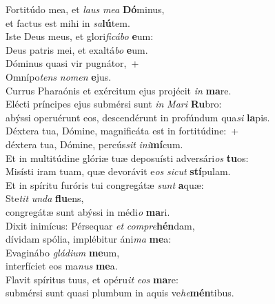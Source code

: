 \evenverse Fortitúdo mea, et \textit{laus} \textit{me}\textit{a} \textbf{Dó}minus,~\*\\
\evenverse et factus est mihi in \textit{sa}\textbf{lú}tem.\\
\oddverse Iste Deus meus, et glori\textit{fi}\textit{cá}\textit{bo} \textbf{e}um:~\*\\
\oddverse Deus patris mei, et exaltá\textit{bo} \textbf{e}um.\\
\evenverse Dóminus quasi vir pugnátor,~+\\
\evenverse  Omnípo\textit{tens} \textit{no}\textit{men} \textbf{e}jus.~\*\\
\evenverse Currus Pharaónis et exércitum ejus projécit \textit{in} \textbf{ma}re.\\
\oddverse Elécti príncipes ejus submérsi sunt \textit{in} \textit{Ma}\textit{ri} \textbf{Ru}bro:~\*\\
\oddverse abýssi operuérunt eos, descendérunt in profúndum qua\textit{si} \textbf{la}pis.\\
\evenverse Déxtera tua, Dómine, magnificáta est in fortitúdine:~+\\
\evenverse  déxtera tua, Dómine, percús\textit{sit} \textit{i}\textit{ni}\textbf{mí}cum.~\*\\
\evenverse Et in multitúdine glóriæ tuæ deposuísti adversári\textit{os} \textbf{tu}os:\\
\oddverse Misísti iram tuam, quæ devorávit e\textit{os} \textit{si}\textit{cut} \textbf{stí}pulam.~\*\\
\oddverse Et in spíritu furóris tui congregátæ \textit{sunt} \textbf{a}quæ:\\
\evenverse Ste\textit{tit} \textit{un}\textit{da} \textbf{flu}ens,~\*\\
\evenverse congregátæ sunt abýssi in médi\textit{o} \textbf{ma}ri.\\
\oddverse Dixit inimícus: Pérsequar \textit{et} \textit{com}\textit{pre}\textbf{hén}dam,~\*\\
\oddverse dívidam spólia, implébitur áni\textit{ma} \textbf{me}a:\\
\evenverse Evaginábo \textit{glá}\textit{di}\textit{um} \textbf{me}um,~\*\\
\evenverse interfíciet eos ma\textit{nus} \textbf{me}a.\\
\oddverse Flavit spíritus tuus, et opéru\textit{it} \textit{e}\textit{os} \textbf{ma}re:~\*\\
\oddverse submérsi sunt quasi plumbum in aquis ve\textit{he}\textbf{mén}tibus.\\
